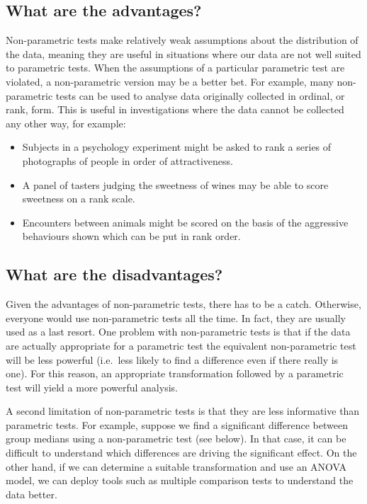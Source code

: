 \documentclass[
]{book}
\providecommand{\tightlist}{%
  \setlength{\itemsep}{0pt}\setlength{\parskip}{0pt}}
\begin{document}
\hypertarget{what-are-the-advantages}{%
\subsection{What are the advantages?}\label{what-are-the-advantages}}

Non-parametric tests make relatively weak assumptions about the distribution of the data, meaning they are useful in situations where our data are not well suited to parametric tests. When the assumptions of a particular parametric test are violated, a non-parametric version may be a better bet. For example, many non-parametric tests can be used to analyse data originally collected in ordinal, or rank, form. This is useful in investigations where the data cannot be collected any other way, for example:

\begin{itemize}
\tightlist
\item
  Subjects in a psychology experiment might be asked to rank a series of photographs of people in order of attractiveness.
\item
  A panel of tasters judging the sweetness of wines may be able to score sweetness on a rank scale.
\item
  Encounters between animals might be scored on the basis of the aggressive behaviours shown which can be put in rank order.
\end{itemize}

\hypertarget{what-are-the-disadvantages}{%
\subsection{What are the disadvantages?}\label{what-are-the-disadvantages}}

Given the advantages of non-parametric tests, there has to be a catch. Otherwise, everyone would use non-parametric tests all the time. In fact, they are usually used as a last resort. One problem with non-parametric tests is that if the data are actually appropriate for a parametric test the equivalent non-parametric test will be less powerful (i.e.~less likely to find a difference even if there really is one). For this reason, an appropriate transformation followed by a parametric test will yield a more powerful analysis.

A second limitation of non-parametric tests is that they are less informative than parametric tests. For example, suppose we find a significant difference between group medians using a non-parametric test (see below). In that case, it can be difficult to understand which differences are driving the significant effect. On the other hand, if we can determine a suitable transformation and use an ANOVA model, we can deploy tools such as multiple comparison tests to understand the data better.
\end{document}
